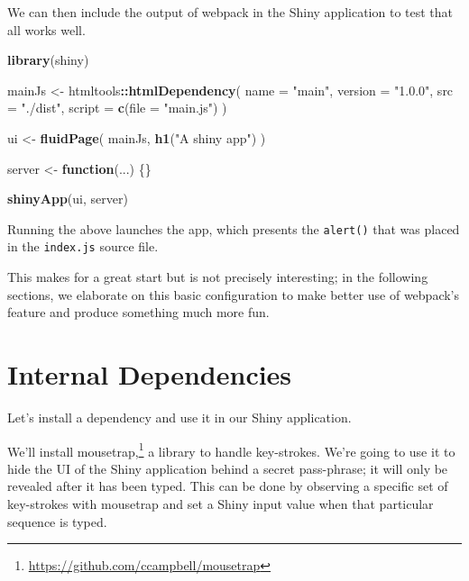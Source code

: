 \documentclass[10pt,]{krantz}
\makeatletter
\newenvironment{Shaded}{\begin{snugshade}}{\end{snugshade}}
\newcommand{\ControlFlowTok}[1]{\textcolor[rgb]{0.27,0.27,0.27}{\textbf{#1}}}
\newcommand{\DataTypeTok}[1]{\textcolor[rgb]{0.27,0.27,0.27}{#1}}
\newcommand{\KeywordTok}[1]{\textcolor[rgb]{0.27,0.27,0.27}{\textbf{#1}}}
\newcommand{\NormalTok}[1]{#1}
\newcommand{\OperatorTok}[1]{\textcolor[rgb]{0.43,0.43,0.43}{\textbf{#1}}}
\newcommand{\StringTok}[1]{\textcolor[rgb]{0.5,0.5,0.5}{#1}}
\renewcommand{\href}[2]{#2\footnote{\url{#1}}}
\newenvironment{kframe}{%
\medskip{}
\setlength{\fboxsep}{.8em}
 \def\at@end@of@kframe{}%
 \ifinner\ifhmode%
  \def\at@end@of@kframe{\end{minipage}}%
  \begin{minipage}{\columnwidth}%
 \fi\fi%
 \def\FrameCommand##1{\hskip\@totalleftmargin \hskip-\fboxsep
 \colorbox{shadecolor}{##1}\hskip-\fboxsep
     \hskip-\linewidth \hskip-\@totalleftmargin \hskip\columnwidth}%
 \MakeFramed {\advance\hsize-\width
   \@totalleftmargin\z@ \linewidth\hsize
   \@setminipage}}%
 {\par\unskip\endMakeFramed%
 \at@end@of@kframe}
\renewenvironment{Shaded}{\begin{kframe}}{\end{kframe}}
\makeatother
\begin{document}
We can then include the output of webpack in the Shiny application to test that all works well.

\begin{Shaded}
\begin{Highlighting}[]
\KeywordTok{library}\NormalTok{(shiny)}

\NormalTok{mainJs <-}\StringTok{ }\NormalTok{htmltools}\OperatorTok{::}\KeywordTok{htmlDependency}\NormalTok{(}
  \DataTypeTok{name =} \StringTok{"main"}\NormalTok{,}
  \DataTypeTok{version =} \StringTok{"1.0.0"}\NormalTok{,}
  \DataTypeTok{src =} \StringTok{"./dist"}\NormalTok{,}
  \DataTypeTok{script =} \KeywordTok{c}\NormalTok{(}\DataTypeTok{file =} \StringTok{"main.js"}\NormalTok{)}
\NormalTok{)}

\NormalTok{ui <-}\StringTok{ }\KeywordTok{fluidPage}\NormalTok{(}
\NormalTok{  mainJs,}
  \KeywordTok{h1}\NormalTok{(}\StringTok{"A shiny app"}\NormalTok{)}
\NormalTok{)}

\NormalTok{server <-}\StringTok{ }\ControlFlowTok{function}\NormalTok{(...) \{\}}

\KeywordTok{shinyApp}\NormalTok{(ui, server)}
\end{Highlighting}
\end{Shaded}

Running the above launches the app, which presents the \texttt{alert()} that was placed in the \texttt{index.js} source file.

This makes for a great start but is not precisely interesting; in the following sections, we elaborate on this basic configuration to make better use of webpack's feature and produce something much more fun.

\hypertarget{webpack-intro-internal-dependencies}{%
\section{Internal Dependencies}\label{webpack-intro-internal-dependencies}}

Let's install a dependency and use it in our Shiny application.

We'll install \href{https://github.com/ccampbell/mousetrap}{mousetrap,} a library to handle key-strokes. We're going to use it to hide the UI of the Shiny application behind a secret pass-phrase; it will only be revealed after it has been typed. This can be done by observing a specific set of key-strokes with mousetrap and set a Shiny input value when that particular sequence is typed.
\end{document}
